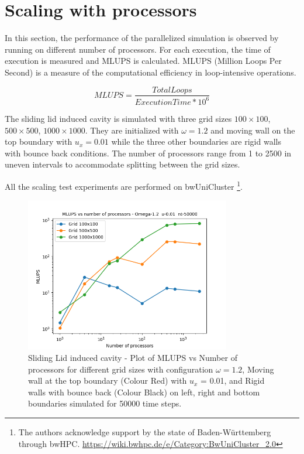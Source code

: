 \documentclass[a4paper,11pt]{report}
\begin{document}
\section{Scaling with processors}
In this section, the performance of the parallelized simulation is observed by running on different number of processors. For each execution, the time of execution is measured and MLUPS is calculated. MLUPS (Million Loops Per Second) is a measure of the computational efficiency in loop-intensive operations.

\begin{equation}
    MLUPS = \frac{Total Loops} {Execution Time * 10^6}
\end{equation}

The sliding lid induced cavity is simulated with three grid sizes $100\times100$, $500\times500$, $1000\times1000$. They are initialized with $\omega=1.2$ and moving wall on the top boundary with $u_x = 0.01$ while the three other boundaries are rigid walls with bounce back conditions. The number of processors range from 1 to 2500 in uneven intervals to accommodate splitting between the grid sizes.

All the scaling test experiments are performed on bwUniCluster \footnote{The authors acknowledge support by the state of Baden-Württemberg through bwHPC. 
 \url{https://wiki.bwhpc.de/e/Category:BwUniCluster_2.0}}.

\begin{figure}[h!]
  \begin{center}
   \includegraphics[width=0.8\textwidth]{HPC_report/images/sliding_lid/Plot_MLUPS.png}
   \caption{Sliding Lid induced cavity - Plot of MLUPS vs Number of processors for different grid sizes with configuration $\omega=1.2$, Moving wall at the top boundary (Colour Red) with $u_x$ = 0.01, and Rigid walls with bounce back (Colour Black) on left, right and bottom boundaries simulated for 50000 time steps.}
  \label{fig:mlups}
  \end{center}
\end{figure} 
\end{document}
